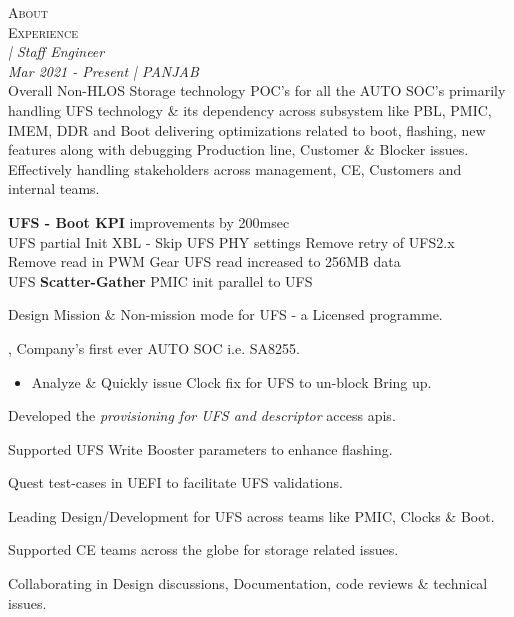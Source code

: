 %
%


%
%
\normalsize{\textsc {About}}\\


%
%
\normalsize{\textsc {Experience}}\\

%
%
%
%
{\large{\textit{\textbf{\CompanyA} | Staff Engineer}}}\\
{\small{\textit{Mar 2021 - Present | PANJAB}}} \\
\scriptsize{Overall Non-HLOS Storage technology POC's for all the AUTO SOC's primarily handling UFS technology \& its dependency across subsystem like PBL, PMIC, IMEM, DDR and Boot \textendash{} delivering optimizations related to boot, flashing, new features along with debugging Production line, Customer \& Blocker issues. \\
Effectively handling stakeholders across management, CE, Customers and internal teams.%
}
\begin{itemize}
\footnotesize {
   \item \noindent \textbf{UFS - Boot KPI} improvements \textemdash{} by 200msec \\
      \textbullet UFS partial Init               \textbullet XBL - Skip UFS PHY settings    \textbullet Remove retry of UFS2.x \\
      \textbullet Remove read in PWM Gear        \textbullet UFS read increased to 256MB data   \\
      \textbullet UFS \textbf{Scatter-Gather}    \textbullet PMIC init parallel to UFS
      \item \noindent Design Mission \& Non-mission mode for UFS - a Licensed programme.
      \item {}, Company's first ever AUTO SOC i.e. SA8255.
%
      \begin{itemize}
      \item \noindent Analyze \& Quickly issue Clock fix for UFS to un-block Bring up.
      \end{itemize}
%
      \item \noindent Developed the \textit{provisioning for UFS and descriptor} access apis.
      \item \noindent Supported UFS Write Booster parameters to enhance flashing.
      \item \noindent Quest test-cases in UEFI to facilitate UFS validations.
      \item \noindent Leading Design/Development for UFS across teams like PMIC, Clocks \& Boot.
      \item \noindent Supported CE teams across the globe for storage related issues.
      \item \noindent Collaborating in Design discussions, Documentation, code reviews \& technical issues.
}
\end{itemize}

